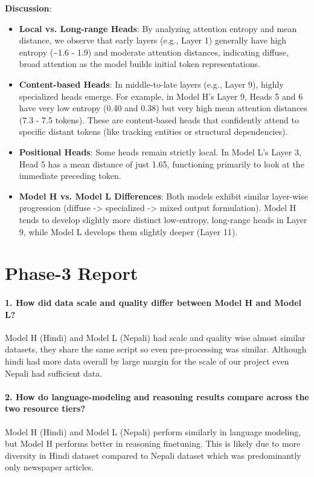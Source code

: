 \documentclass[10pt,a4paper]{article}
\begin{document}
\textbf{Discussion}:
\begin{itemize}
\item \textbf{Local vs. Long-range Heads}: By analyzing attention entropy and mean distance, we observe that early layers (e.g., Layer 1) generally have high entropy (\textasciitilde{}1.6 - 1.9) and moderate attention distances, indicating diffuse, broad attention as the model builds initial token representations.
\item \textbf{Content-based Heads}: In middle-to-late layers (e.g., Layer 9), highly specialized heads emerge. For example, in Model H's Layer 9, Heads 5 and 6 have very low entropy (0.40 and 0.38) but very high mean attention distances (7.3 - 7.5 tokens). These are content-based heads that confidently attend to specific distant tokens (like tracking entities or structural dependencies).
\item \textbf{Positional Heads}: Some heads remain strictly local. In Model L's Layer 3, Head 5 has a mean distance of just 1.65, functioning primarily to look at the immediate preceding token.
\item \textbf{Model H vs. Model L Differences}: Both models exhibit similar layer-wise progression (diffuse -> specialized -> mixed output formulation). Model H tends to develop slightly more distinct low-entropy, long-range heads in Layer 9, while Model L develops them slightly deeper (Layer 11).
\end{itemize}

\section{Phase-3 Report}

\paragraph{1. How did data scale and quality differ between Model H and Model L?}
Model H (Hindi) and Model L (Nepali) had scale and quality wise almost similar datasets, they share the same script so even pre-processing was similar. Although hindi had more data overall by large margin for the scale of our project even Nepali had sufficient data.

\paragraph{2. How do language-modeling and reasoning results compare across the two resource tiers?}
Model H (Hindi) and Model L (Nepali) perform similarly in language modeling, but Model H performs better in reasoning finetuning. This is likely due to more diversity in Hindi dataset compared to Nepali dataset which was predominantly only newspaper articles.
\end{document}
